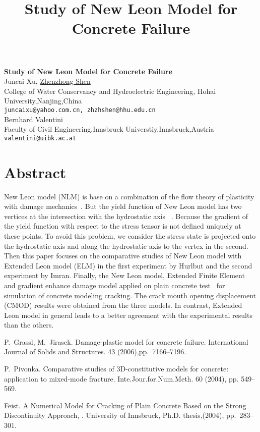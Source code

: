 \title{Study of New Leon Model for Concrete Failure}
\author{} \institute{}

\begin{center}

\textbf{\Large Study of New Leon Model for Concrete Failure}\\
\vspace{10mm}
{\large  Juncai Xu, \underline {Zhenzhong Shen}}\\
College of Water Conservancy and Hydroelectric Engineering, Hohai University,Nanjing,China\\
{\tt juncaixu@yahoo.com.cn, zhzhshen@hhu.edu.cn}\\
\vspace{4mm}
{\large {Bernhard Valentini}}\\
Faculty of Civil Engineering,Innsbruck Universtiy,Innsbruck,Austria\\
{\tt valentini@uibk.ac.at}

\end{center}

\section*{Abstract}

New Leon model (NLM) is base on a combination of the flow theory of plasticity with damage mechanics~\cite{Grassl}. But the yield function of New Leon model has two vertices at the intersection with the hydrostatic axis ~\cite{Pivonka}. Because the gradient of the yield function with respect to the stress tensor is not defined uniquely at these points. To avoid this problem, we consider the stress state is projected onto the hydrostatic axis and along the hydrostatic axis to the vertex in the second. Then this paper focuses on the comparative studies of New Leon model with Extended Leon model (ELM) in the first experiment by Hurlbut and the second experiment by Imran. Finally, the New Leon model, Extended Finite Element and gradient enhance damage model applied on plain concrete test~\cite{Feist} for simulation of concrete modeling cracking. The crack mouth opening displacement (CMOD) results were obtained from the three models. In contrast, Extended Leon model in general leads to a better agreement with the experimental results than the others.


\begin{thebibliography}{10}

{\sc P.~Grassl, M.~Jirasek}. {Damage-plastic model for concrete failure}. International Journal of Solids and Structures. 43 (2006),pp.~7166--7196.

{\sc P.~Pivonka}.
\newblock Comparative studies of 3D-constitutive models for concrete: application to mixed-mode fracture.
\newblock Inte.Jour.for.Num.Meth. 60 (2004), pp. 549--569. 

{\sc Feist}. {A Numerical Model for Cracking of Plain Concrete Based on the Strong Discontinuity Approach, }. University of Innsbruck, Ph.D. thesis,(2004), pp.~283--301.

\end{thebibliography}